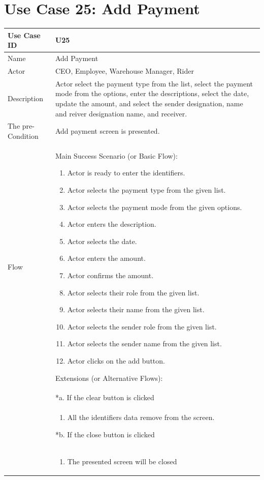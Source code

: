 \documentclass[12pt,a4paper]{report}
\begin{document}
\section{Use Case 25: Add Payment}
\begin{tabular}{ | m{3cm} | m{12cm}| } \hline
Use Case ID & U25   \\\hline
Name  &  Add Payment \\ \hline
Actor &   CEO, Employee, Warehouse Manager, Rider \\ \hline
Description & Actor select the payment type from the list, select the payment mode from the options, enter the descriptions, select the date, update the amount, and select the sender designation, name and reiver designation name, and receiver. \\ \hline
The pre-Condition & Add payment screen is presented.  \\\hline
Flow & Main Success Scenario (or Basic Flow):
\begin{enumerate}
\item Actor is ready to enter the identifiers.
\item Actor selects the payment type from the given list.   
\item Actor selects the payment mode from the given options.
\item Actor enters the description.
\item Actor selects the date. 
\item Actor enters the amount.
\item Actor confirms the amount.
\item Actor selects their role from the given list.
\item Actor selects their name from the given list.
\item Actor selects the sender role from the given list.
\item Actor selects the sender name from the given list.
\item Actor clicks on the add button.
\end{enumerate}
Extensions (or Alternative Flows):\\
& *a. If the clear button is clicked \\
& \begin{enumerate}
		\item All the identifiers data remove from the screen.
	\end{enumerate}
*b. If the close button is clicked\\
&	\begin{enumerate}
		\item The presented screen will be closed
	\end{enumerate}
\\\hline
\end{tabular}
\end{document}
